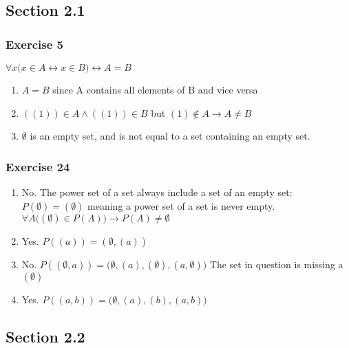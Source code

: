 \documentclass[a4paper]{article}
\newcommand{\ex}[1]{\subsubsection*{#1}}
\begin{document}
\pagestyle{fancy} %



\vspace{2em}
\subsection*{Section 2.1}
\vspace{1em}

\ex{Exercise 5}
\( \forall x \big( x \in A \leftrightarrow x \in B  \big) \leftrightarrow A = B \)   
\begin{enumerate}[label=\alph*)]
    \item \( A = B \) since A contains all elements of B and vice versa

    \item \( ((1)) \in A \land ((1)) \in B \) but \( (1) \notin A \rightarrow A \neq B\) 

    \item \( \emptyset \) is an empty set, and is not equal to a set containing an empty set.
\end{enumerate}


\ex{Exercise 24}
\begin{enumerate}[label=\alph*)]
    \item No. The power set of a set always include a set of an empty set: 
        \( P(\emptyset) = (\emptyset) \) 
        meaning a power set of a set is never empty. 
        \( \forall A \big( (\emptyset) \in P(A)  \big) \rightarrow 
        P(A) \neq \emptyset\)

    \item Yes. \( P((a)) = (\emptyset, (a)) \)

    \item No. \( P((\emptyset, a)) = 
        \big(\emptyset, (a), (\emptyset), (a, \emptyset)\big) \)
        The set in question is missing a \((\emptyset)\)

    \item Yes. \( P((a, b)) = \big(\emptyset, (a), (b), (a,b)\big) \) 
\end{enumerate}



\vspace{2em}
\subsection*{Section 2.2}
\vspace{1em}
\end{document}
